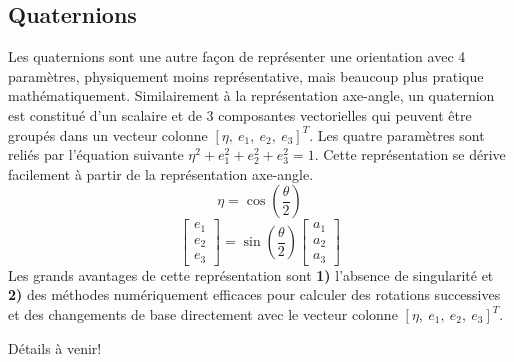 \subsection{Quaternions}
\label{sec:quaternions}
Les quaternions sont une autre façon de représenter une orientation avec 4 paramètres, physiquement moins représentative, mais beaucoup plus pratique mathématiquement. Similairement à la représentation axe-angle, un quaternion est constitué d'un scalaire et de 3 composantes vectorielles qui peuvent être groupés dans un vecteur colonne $[\eta,\ e_{1},\ e_{2},\ e_{3}]^T$. Les quatre paramètres sont reliés par l'équation suivante $\eta^2+e_{1}^2+e_{2}^2+e_{3}^2=1$. Cette représentation se dérive facilement à partir de la représentation axe-angle.
\begin{equation}
	\eta=\cos\left(\frac{\theta}{2}\right)
\end{equation}
\begin{equation}
	\left[ \begin{array}{c} e_{1} \\ e_{2} \\ e_{3} \end{array}
		\right]
	=\sin\left(\frac{\theta}{2}\right) \left[ \begin{array}{c} a_{1} \\ a_{2} \\ a_{3} \end{array}
		\right]
\end{equation}
Les grands avantages de cette représentation sont \textbf{1)} l'absence de singularité et \textbf{2)} des méthodes numériquement efficaces pour calculer des rotations successives et des changements de base directement avec le vecteur colonne $[\eta,\ e_{1},\ e_{2},\ e_{3}]^T$.

Détails à venir!







